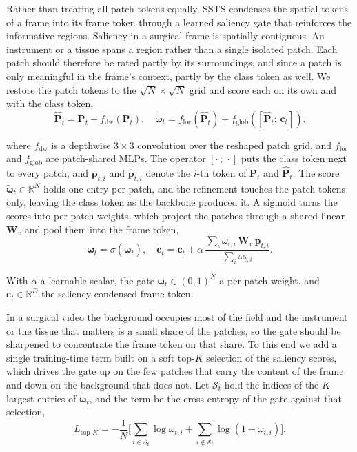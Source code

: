 Rather than treating all patch tokens equally, SSTS condenses the spatial tokens of a frame into its
frame token through a learned saliency gate that reinforces the informative regions.
Saliency in a surgical frame is spatially contiguous.
An instrument or a tissue spans a region rather than a single isolated patch.
Each patch should therefore be rated partly by its surroundings, and since a patch is only meaningful
in the frame's context, partly by the class token as well.
We restore the patch tokens to the $\sqrt{N}\times\sqrt{N}$ grid and score each on its own and with
the class token,
\begin{equation}
  \hat{\mathbf{P}}_t = \mathbf{P}_t + f_{\mathrm{dw}}(\mathbf{P}_t),
  \quad
  \tilde{\boldsymbol{\omega}}_t = f_{\mathrm{loc}}(\hat{\mathbf{P}}_t)
  + f_{\mathrm{glob}}([\hat{\mathbf{P}}_t;\,\mathbf{c}_t]).
  \label{eq:ssts-score}
\end{equation}

\noindent where $f_{\mathrm{dw}}$ is a depthwise $3\times3$ convolution over the reshaped patch grid,
and $f_{\mathrm{loc}}$ and $f_{\mathrm{glob}}$ are patch-shared MLPs.
The operator $[\cdot\,;\,\cdot]$ puts the class token next to every patch, and $\mathbf{p}_{t,i}$ and
$\hat{\mathbf{p}}_{t,i}$ denote the $i$-th token of $\mathbf{P}_t$ and $\hat{\mathbf{P}}_t$.
The score $\tilde{\boldsymbol{\omega}}_t \in \mathbb{R}^{N}$ holds one entry per patch, and the
refinement touches the patch tokens only, leaving the class token as the backbone produced it.
A sigmoid turns the scores into per-patch weights, which project the patches through a shared linear
$\mathbf{W}_v$ and pool them into the frame token,
\begin{equation}
  \boldsymbol{\omega}_t = \sigma(\tilde{\boldsymbol{\omega}}_t),
  \quad
  \tilde{\mathbf{c}}_t = \mathbf{c}_t
  + \alpha\,
  \frac{\sum_i \omega_{t,i}\,\mathbf{W}_v\,\mathbf{p}_{t,i}}{\sum_i \omega_{t,i}}.
  \label{eq:ssts-weight}
\end{equation}

\noindent With $\alpha$ a learnable scalar, the gate
$\boldsymbol{\omega}_t \in (0,1)^{N}$ a per-patch weight, and
$\tilde{\mathbf{c}}_t \in \mathbb{R}^{D}$ the saliency-condensed frame token.

In a surgical video the background occupies most of the field and the instrument or the tissue that
matters is a small share of the patches, so the gate should be sharpened to concentrate the frame
token on that share.
To this end we add a single training-time term built on a soft top-$K$ selection of the saliency
scores, which drives the gate up on the few patches that carry the content of the frame and down on
the background that does not.
Let $\mathcal{S}_t$ hold the indices of the $K$ largest entries of $\tilde{\boldsymbol{\omega}}_t$,
and the term be the cross-entropy of the gate against that selection,
\begin{equation}
  L_{\mathrm{top}\text{-}K} = -\frac{1}{N}\Big[\sum_{i \in \mathcal{S}_t}\log \omega_{t,i}
  + \sum_{i \notin \mathcal{S}_t}\log(1-\omega_{t,i})\Big].
  \label{eq:ssts-loss}
\end{equation}

